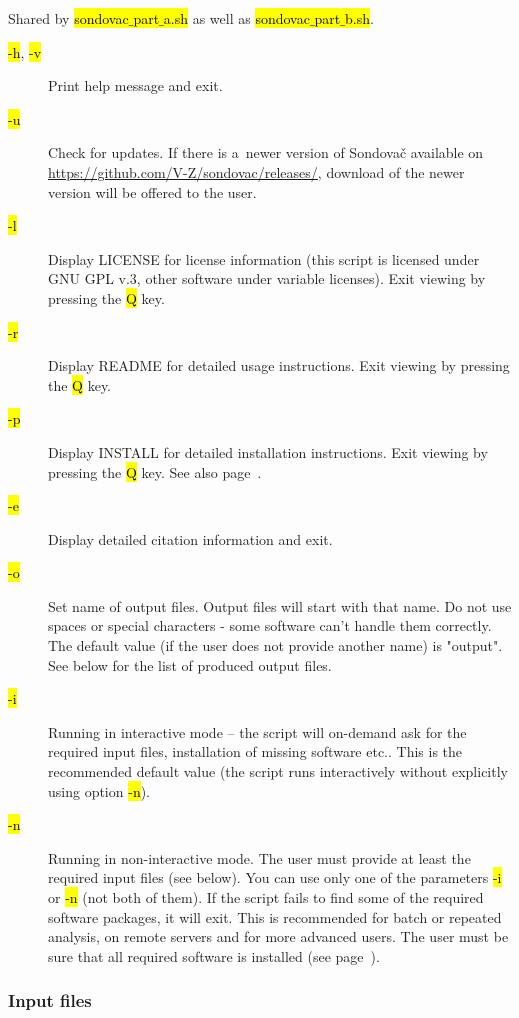 \documentclass[a4paper, 11pt, twoside]{article}
\renewcommand{\texttt}[1]{\hl{\ttfamily #1}}
\begin{document}
Shared by \texttt{sondovac$\_$part$\_$a.sh} as well as \texttt{sondovac$\_$part$\_$b.sh}.

\begin{description}
  \item[\texttt{-h}, \texttt{-v}] Print help message and exit.
  \item[\texttt{-u}] Check for updates. If there is a~newer version of Sondovač available on \url{https://github.com/V-Z/sondovac/releases/}, download of the newer version will be offered to the user.
  \item[\texttt{-l}] Display LICENSE for license information (this script is licensed under GNU GPL v.3, other software under variable licenses). Exit viewing by pressing the \texttt{Q} key.
  \item[\texttt{-r}] Display README for detailed usage instructions. Exit viewing by pressing the \texttt{Q} key.
  \item[\texttt{-p}] Display INSTALL for detailed installation instructions. Exit viewing by pressing the \texttt{Q} key. See also page~\pageref{install}.
  \item[\texttt{-e}] Display detailed citation information and exit.
  \item[\texttt{-o}] Set name of output files. Output files will start with that name. Do not use spaces or special characters - some software can't handle them correctly. The default value (if the user does not provide another name) is "output". See below for the list of produced output files.
  \item[\texttt{-i}] Running in interactive mode -- the script will on-demand ask for the required input files, installation of missing software etc.. This is the recommended default value (the script runs interactively without explicitly using option \texttt{-n}).
  \item[\texttt{-n}] Running in non-interactive mode. The user must provide at least the required input files (see below). You can use only one of the parameters \texttt{-i} or \texttt{-n} (not both of them). If the script fails to find some of the required software packages, it will exit. This is recommended for batch or repeated analysis, on remote servers and for more advanced users. The user must be sure that all required software is installed (see page~\pageref{install}).
\end{description}

\subsubsection{Input files}
\end{document}
